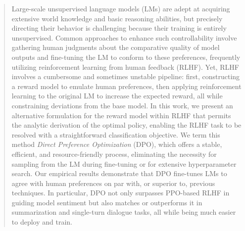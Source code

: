 \begin{abstract}
Large-scale unsupervised language models (LMs) are adept at acquiring extensive world knowledge and basic reasoning abilities, but precisely directing their behavior is challenging because their training is entirely unsupervised. Common approaches to enhance such controllability involve gathering human judgments about the comparative quality of model outputs and fine-tuning the LM to conform to these preferences, frequently utilizing reinforcement learning from human feedback (RLHF). Yet, RLHF involves a cumbersome and sometimes unstable pipeline: first, constructing a reward model to emulate human preferences, then applying reinforcement learning to the original LM to increase the expected reward, all while constraining deviations from the base model. In this work, we present an alternative formulation for the reward model within RLHF that permits the analytic derivation of the optimal policy, enabling the RLHF task to be resolved with a straightforward classification objective. We term this method \textit{Direct Preference Optimization} (DPO), which offers a stable, efficient, and resource-friendly process, eliminating the necessity for sampling from the LM during fine-tuning or for extensive hyperparameter search. Our empirical results demonstrate that DPO fine-tunes LMs to agree with human preferences on par with, or superior to, previous techniques. In particular, DPO not only surpasses PPO-based RLHF in guiding model sentiment but also matches or outperforms it in summarization and single-turn dialogue tasks, all while being much easier to deploy and train.
\end{abstract}

